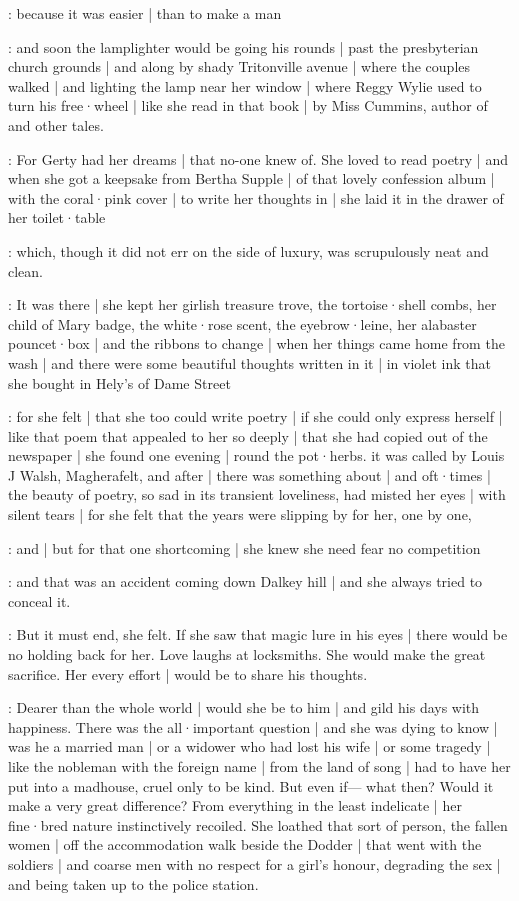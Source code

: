 \gertyReal:
because it was easier |
than to make a man

\gertyNovel:
and soon the lamplighter would be going his rounds |
past the presbyterian church grounds |%
and along by shady Tritonville avenue |
where the couples walked |
and lighting the lamp near her window |
where Reggy Wylie used to turn his free·wheel |
like she read in that book |
 by Miss Cummins,
author of  and other tales.

\gertyRomantic:
For Gerty had her dreams |
that no-one knew of.
She loved to read poetry |
and when she got a keepsake from Bertha Supple |
of that lovely confession album |
with the coral·pink cover |
to write her thoughts in |
she laid it in the drawer of her toilet·table

\gertyReal:
which,
though it did not err on the side of luxury,
was scrupulously neat and clean.

\gertyNovel:
It was there |
she kept her girlish treasure trove,
the tortoise·shell combs,
her child of Mary badge,
the white·rose scent,
the eyebrow·leine,%
her alabaster pouncet·box |
and the ribbons to change |
when her things came home from the wash |
and there were
some beautiful thoughts written in it |
in violet ink that she bought in Hely's of Dame Street

\gertyRomantic:
for she felt |
that she too could write poetry |
if she could only express herself |
like that poem that appealed to her so deeply |
that she had copied out of the newspaper |
she found one evening |
round the pot·herbs.
it was called by Louis J Walsh,
Magherafelt,
and after |
there was something about
 |
and oft·times |
the beauty of poetry,
so sad in its transient loveliness,
had misted her eyes |
with silent tears |
for she felt
that the years were slipping by for her,
one by one,

\gertyNovel:
and |
but for that one shortcoming |%
she knew she need fear no competition

\gertyReal:
and that was an accident coming down Dalkey hill |
and she always tried to conceal it.

\gertyNovel:
But it must end,
she felt.
If she saw that magic lure in his eyes |
there would be no holding back for her.
Love laughs at locksmiths.
She would make the great sacrifice.
Her every effort |
would be to share his thoughts.

\gertyRomantic:
Dearer than the whole world |
would she be to him |
and gild his days with happiness.
There was the all·important question |
and she was dying to know |
was he a married man |
or a widower who had lost his wife |
or some tragedy |
like the nobleman with the foreign name |
from the land of song |
had to have her put into a madhouse,
cruel only to be kind.
But even if—%
what then?
Would it make a very great difference?%
From everything in the least indelicate |
her fine·bred nature instinctively recoiled.
She loathed that sort of person,
the fallen women |
off the accommodation walk beside the Dodder |
that went with the soldiers |
and coarse men
with no respect for a girl's honour,
degrading the sex |
and being taken up to the police station.

